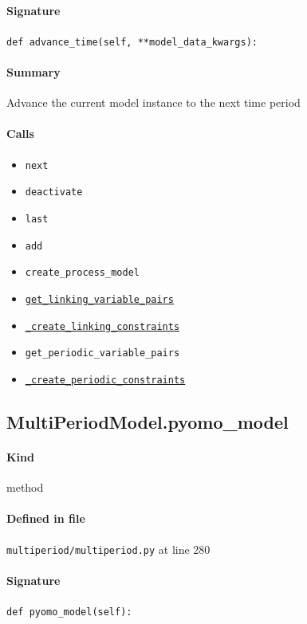 \documentclass[11pt]{report}
\begin{document}
\paragraph{Signature} \texttt{def advance\_time(self, **model\_data\_kwargs):}
\paragraph{Summary} Advance the current model instance to the next time period
\paragraph{Calls}
\begin{itemize}[leftmargin=*]
  \item \texttt{next}
  \item \texttt{deactivate}
  \item \texttt{last}
  \item \texttt{add}
  \item \texttt{create\_process\_model}
  \item \hyperref[def:multiperiod-tests-test_multiperiod.py:get_linking_variable_pairs:L58]{\texttt{get\_linking\_variable\_pairs}}
  \item \hyperref[def:multiperiod-multiperiod.py:MultiPeriodModel._create_linking_constraints:L299]{\texttt{\_create\_linking\_constraints}}
  \item \texttt{get\_periodic\_variable\_pairs}
  \item \hyperref[def:multiperiod-multiperiod.py:MultiPeriodModel._create_periodic_constraints:L307]{\texttt{\_create\_periodic\_constraints}}
\end{itemize}
\subsection{MultiPeriodModel.pyomo\_model}
\label{def:multiperiod-multiperiod.py:MultiPeriodModel.pyomo_model:L280}
\paragraph{Kind} method
\paragraph{Defined in file} \texttt{multiperiod/multiperiod.py} at line 280
\paragraph{Signature} \texttt{def pyomo\_model(self):}
\end{document}
